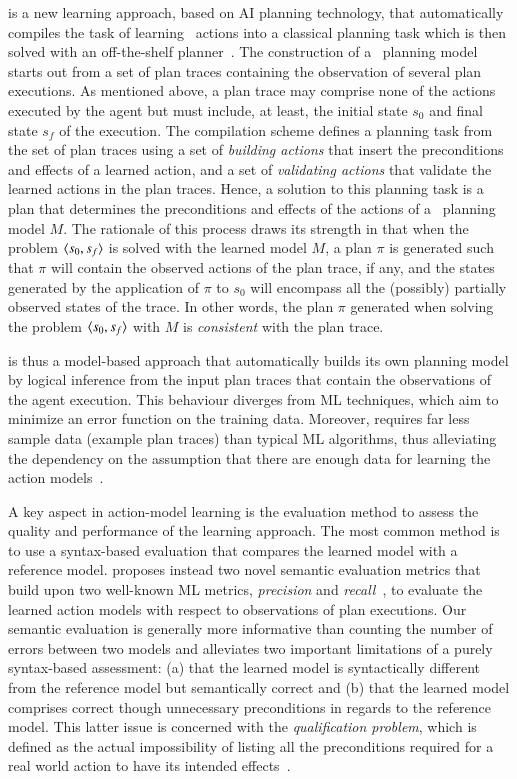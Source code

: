 \textcolor[rgb]{1.00,0.00,0.00}{\FAMA is a new learning approach, based on AI planning technology, that automatically compiles the task of learning \strips\ actions into a classical planning task which is then solved with an off-the-shelf planner~\cite{aineto2018learning}. The construction of a \strips\ planning model starts out from a set of plan traces containing the observation of several plan executions. As mentioned above, a plan trace may comprise none of the actions executed by the agent but must include, at least, the initial state $s_0$ and final state $s_f$ of the execution. The compilation scheme defines a planning task from the set of plan traces using a set of \emph{building actions} that insert the preconditions and effects of a learned action, and a set of \emph{validating actions} that validate the learned actions in the plan traces. Hence, a solution to this planning task is a plan that determines the preconditions and effects of the actions of a \strips\ planning model $M$. The rationale of this process draws its strength in that when the problem ${\langle s_0,s_f \rangle}$ is solved with the learned model $M$, a plan $\pi$ is generated such that $\pi$ will contain the observed actions of the plan trace, if any, and the states generated by the application of $\pi$ to $s_0$ will encompass all the (possibly) partially observed states of the trace. In other words, the plan $\pi$ generated when solving the problem ${\langle s_0,s_f \rangle}$ with $M$ is \emph{consistent} with the plan trace.}

\FAMA is thus a model-based approach that automatically builds its own planning model by logical inference from the input plan traces that contain the observations of the agent execution. This behaviour diverges from ML techniques, which aim to minimize an error function on the training data. Moreover, \FAMA requires far less sample data (example plan traces) than typical ML algorithms, thus alleviating the dependency on the assumption that there are enough data for learning the action models~\cite{Zhuo15}.

A key aspect in action-model learning is the evaluation method to assess the quality and performance of the learning approach. The most common method is to use a syntax-based evaluation that compares the learned model with a reference model. \FAMA proposes instead two novel semantic evaluation metrics that build upon two well-known ML metrics, {\em precision} and {\em recall}~\cite{davis2006relationship}, to evaluate the learned action models with respect to observations of plan executions. Our semantic evaluation is generally more informative than counting the number of errors between two models and alleviates two important limitations of a purely syntax-based assessment: (a) that the learned model is syntactically different from the reference model but semantically correct and (b) that the learned model comprises correct though unnecessary preconditions in regards to the reference model. This latter issue is concerned with the {\em qualification problem}, which is defined as the actual impossibility of listing all the preconditions required for a real world action to have its intended effects~\cite{GinsbergS88}.

